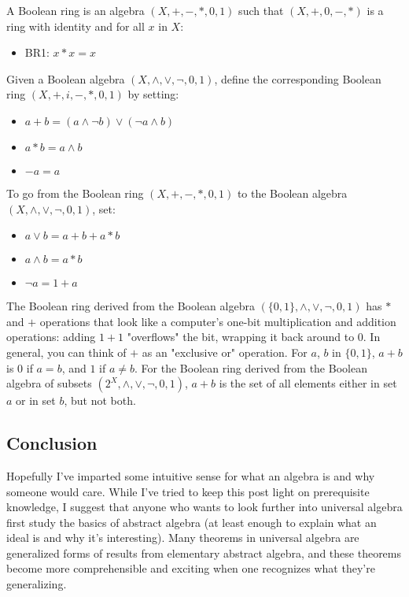 \documentclass{article} %
\begin{document}
\begin{itemize}
{\begin{itemize}
\begin{itemize}
A Boolean ring is an algebra $ (X, +, -, \ast, 0, 1)$ such that $ (X, +, 0, -, \ast)$ is a ring with identity and for all $ x$ in $ X$:

\begin{itemize}
\item{BR1: $ x \ast x = x$}
\end{itemize}

Given a Boolean algebra $ (X, \land, \lor, \neg, 0, 1)$, define the corresponding Boolean ring $ (X, +, i, -, \ast, 0, 1)$ by setting:

\begin{itemize}
\item{$ a + b = (a \land \neg b) \lor (\neg a \land b)$}
\item{$ a \ast b = a \land b$}
\item{$  -a = a$}
\end{itemize}

To go from the Boolean ring $ (X, +, -, \ast, 0, 1)$ to the Boolean algebra $ (X, \land, \lor, \neg, 0, 1)$, set:

\begin{itemize}
\item{$ a \lor b = a + b + a \ast b$}
\item{$ a \land b = a \ast b$}
\item{$ \neg a = 1 + a$}
\end{itemize}

The Boolean ring derived from the Boolean algebra $ (\{0, 1\}, \land, \lor, \neg, 0, 1)$ has $ \ast$ and $ +$ operations that look like a computer's one-bit multiplication and addition operations: adding $ 1 + 1$ "overflows" the bit, wrapping it back around to $ 0$. In general, you can think of $ +$ as an "exclusive or" operation. For $ a$, $ b$ in $ \{0, 1\}$, $ a + b$ is $ 0$ if $ a = b$, and $ 1$ if $ a \neq b$. For the Boolean ring derived from the Boolean algebra of subsets $ (2^X, \land, \lor, \neg, 0, 1)$, $ a + b$ is the set of all elements either in set $ a$ or in set $ b$, but not both.

\subsection{Conclusion}

Hopefully I've imparted some intuitive sense for what an algebra is and why someone would care. While I've tried to keep this post light on prerequisite knowledge, I suggest that anyone who wants to look further into universal algebra first study the basics of abstract algebra (at least enough to explain what an ideal is and why it's interesting). Many theorems in universal algebra are generalized forms of results from elementary abstract algebra, and these theorems become more comprehensible and exciting when one recognizes what they're generalizing. 


\end{itemize}
\end{itemize}}
\end{itemize}
\end{document}
